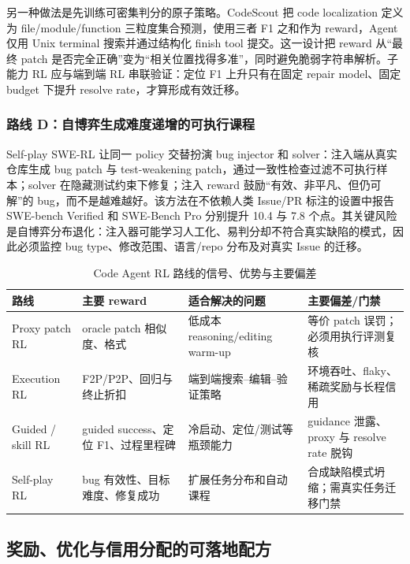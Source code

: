 \documentclass[10pt,a4paper,UTF8,fontset=none]{ctexart}
\begin{document}
另一种做法是先训练可密集判分的原子策略。CodeScout 把 code localization 定义为 file/module/function 三粒度集合预测，使用三者 F1 之和作为 reward，Agent 仅用 Unix terminal 搜索并通过结构化 finish tool 提交\cite{sutawika2026codescout}。这一设计把 reward 从“最终 patch 是否完全正确”变为“相关位置找得多准”，同时避免脆弱字符串解析。子能力 RL 应与端到端 RL 串联验证：定位 F1 上升只有在固定 repair model、固定 budget 下提升 resolve rate，才算形成有效迁移。

\subsubsection{路线 D：自博弈生成难度递增的可执行课程}

Self-play SWE-RL 让同一 policy 交替扮演 bug injector 和 solver：注入端从真实仓库生成 bug patch 与 test-weakening patch，通过一致性检查过滤不可执行样本；solver 在隐藏测试约束下修复；注入 reward 鼓励“有效、非平凡、但仍可解”的 bug，而不是越难越好\cite{wei2025selfplay}。该方法在不依赖人类 Issue/PR 标注的设置中报告 SWE-bench Verified 和 SWE-Bench Pro 分别提升 10.4 与 7.8 个点。其关键风险是自博弈分布退化：注入器可能学习人工化、易判分却不符合真实缺陷的模式，因此必须监控 bug type、修改范围、语言/repo 分布及对真实 Issue 的迁移。

\begin{table}[htbp]
\centering
\caption{Code Agent RL 路线的信号、优势与主要偏差}
\label{tab:rl-routes}
\small
\begin{tabularx}{\textwidth}{p{2.2cm}p{3.2cm}YY}
\toprule
路线 & 主要 reward & 适合解决的问题 & 主要偏差/门禁 \\
\midrule
Proxy patch RL & oracle patch 相似度、格式 & 低成本 reasoning/editing warm-up & 等价 patch 误罚；必须用执行评测复核 \\
Execution RL & F2P/P2P、回归与终止折扣 & 端到端搜索--编辑--验证策略 & 环境吞吐、flaky、稀疏奖励与长程信用 \\
Guided / skill RL & guided success、定位 F1、过程里程碑 & 冷启动、定位/测试等瓶颈能力 & guidance 泄露、proxy 与 resolve rate 脱钩 \\
Self-play RL & bug 有效性、目标难度、修复成功 & 扩展任务分布和自动课程 & 合成缺陷模式坍缩；需真实任务迁移门禁 \\
\bottomrule
\end{tabularx}
\end{table}

\subsection{奖励、优化与信用分配的可落地配方}
\end{document}
